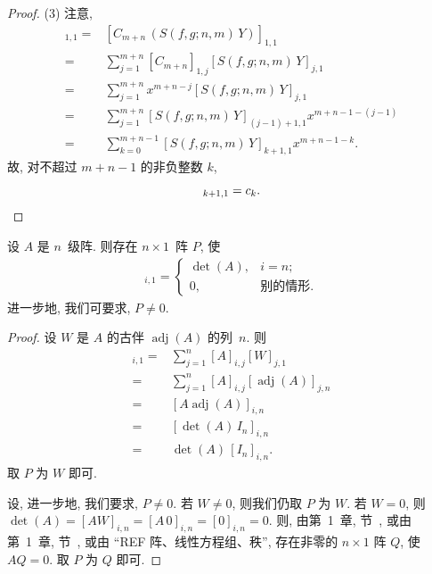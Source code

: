 \documentclass[../libro.tex]{subfiles}
\begin{document}
\begin{proof}
    (3)
    注意,
    \begin{align*}
        [C_{m+n}\, S(f, g; n, m)\, Y]_{1,1}
        = {} &
        [C_{m+n}\, (S(f, g; n, m)\, Y)]_{1,1}
        \\
        = {} &
        \sum_{j = 1}^{m+n}
        {[C_{m+n}]_{1,j} [S(f, g; n, m)\, Y]_{j,1}}
        \\
        = {} &
        \sum_{j = 1}^{m+n}
        {x^{m+n-j} [S(f, g; n, m)\, Y]_{j,1}}
        \\
        = {} &
        \sum_{j = 1}^{m+n}
        {[S(f, g; n, m)\, Y]_{(j-1)+1,1} x^{m+n-1-(j-1)}}
        \\
        = {} &
        \sum_{k = 0}^{m+n-1}
        {[S(f, g; n, m)\, Y]_{k+1,1} x^{m+n-1-k}}.
    \end{align*}
    故, 对不超过 \(m+n-1\) 的非负整数 \(k\),
    \begin{equation*}
        [S(f, g; n, m)\, Y]_{k+1,1} = c_k.
        \qedhere
    \end{equation*}
\end{proof}

\begin{theorem}
    设 \(A\) 是 \(n\)~级阵.
    则存在 \(n \times 1\)~阵 \(P\),
    使
    \begin{align*}
        [A P]_{i,1} =
        \begin{cases}
            \det {(A)}, & i = n;       \\
            0,          & \text{别的情形}.
        \end{cases}
    \end{align*}
    进一步地, 我们可要求, \(P \neq 0\).
\end{theorem}

\begin{proof}
    设 \(W\) 是 \(A\) 的古伴 \(\operatorname{adj} {(A)}\) 的列~\(n\).
    则
    \begin{align*}
        [A W]_{i,1}
        = {} &
        \sum_{j = 1}^{n} {[A]_{i,j} [W]_{j,1}}
        \\
        = {} &
        \sum_{j = 1}^{n} {[A]_{i,j} [\operatorname{adj} {(A)}]_{j,n}}
        \\
        = {} &
        [A \operatorname{adj} {(A)}]_{i,n}
        \\
        = {} &
        [\det {(A)}\, I_n]_{i,n}
        \\
        = {} &
        \det {(A)}\, [I_n]_{i,n}.
    \end{align*}
    取 \(P\) 为 \(W\) 即可.

    设, 进一步地, 我们要求, \(P \neq 0\).
    若 \(W \neq 0\), 则我们仍取 \(P\) 为 \(W\).
    若 \(W = 0\), 则
    \(\det {(A)} = [A W]_{i,n} = [A\, 0]_{i,n} = [0]_{i,n} = 0\).
    则, 由第~1~章, 节~,
    或由第~1~章, 节~,
    或由 ``REF 阵、线性方程组、秩'',
    存在非零的 \(n \times 1\) 阵 \(Q\),
    使 \(A Q = 0\).
    取 \(P\) 为 \(Q\) 即可.
\end{proof}
\end{document}
